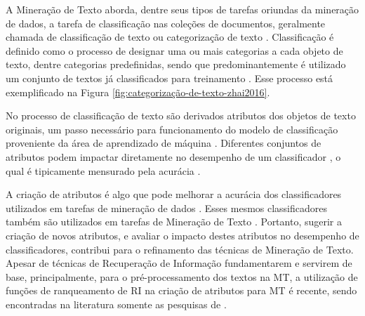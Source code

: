     
    
    A Mineração de Texto aborda, dentre seus tipos de tarefas oriundas da mineração de dados, a tarefa de classificação nas coleções de documentos, geralmente chamada de classificação de texto ou categorização de texto \cite[p.~35]{Zhai2016TDMA}.
    Classificação é definido como o processo de designar uma ou mais categorias a cada objeto de texto, dentre categorias predefinidas, sendo que predominantemente é utilizado um conjunto de textos já classificados para treinamento \cite[p.~7]{Jo2018TMCIBDC} \cite[p.~299]{Zhai2016TDMA}.
    Esse processo está exemplificado na Figura \ref{fig:categorização-de-texto-zhai2016}.
    
    No processo de classificação de texto são derivados atributos dos objetos de texto originais, um passo necessário para funcionamento do modelo de classificação proveniente da área de aprendizado de máquina \cite[p.~64]{Feldman:2006:TMH:1076381}.
    Diferentes conjuntos de atributos podem impactar diretamente no desempenho de um classificador \cite[p.~304--306]{Zhai2016TDMA}, o qual é tipicamente mensurado pela acurácia\footnotemark{} \cite[p.~313--314]{Zhai2016TDMA} \cite[p.~9]{Jo2018TMCIBDC}.
    
    
    A criação de atributos\footnotemark{} é algo que pode melhorar a acurácia dos classificadores utilizados em tarefas de mineração de dados \cite[p.~118]{MaFEDS2018}.
    Esses mesmos classificadores também são utilizados em tarefas de Mineração de Texto \cite[p.~1241]{Sammut2017EMLDM}. 
    Portanto, sugerir a criação de novos atributos, e avaliar o impacto destes atributos no desempenho de classificadores, contribui para o refinamento das técnicas de Mineração de Texto.
    Apesar de técnicas de Recuperação de Informação fundamentarem e servirem de base, principalmente, para o pré-processamento dos textos na MT, a utilização de funções de ranqueamento de RI na criação de atributos para MT é recente, sendo encontradas na literatura somente as pesquisas de .
    
